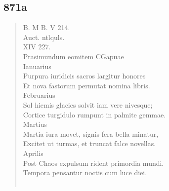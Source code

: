 \documentclass[11pt, a4paper]{report}
\begin{document}
            \subsection*{871a}
      \begin{verse}
      B. M B. V 214. \\ Auct. ntlquls. \\ XIV 227. \\ Prasimundum eomitem CGapuae \\ Ianuarius \\ Purpura iuridicis sacros largitur honores \\ Et nova fastorum permutat nomina libris. \\ Februarius \\ Sol hiemis glacies solvit iam vere nivesque; \\ Cortice turgidulo rumpunt in palmite gemmae. \\ Martius \\ Martia iura movet, signis fera bella minatur, \\ Excitet ut turmas, et truncat falce novellas. \\ Aprilis \\ Post Chaos expulsum rident primordia mundi. \\ Tempora pensantur noctis cum luce diei. \\ 
        ﻿\pagebreak 

\end{verse}
\end{document}
